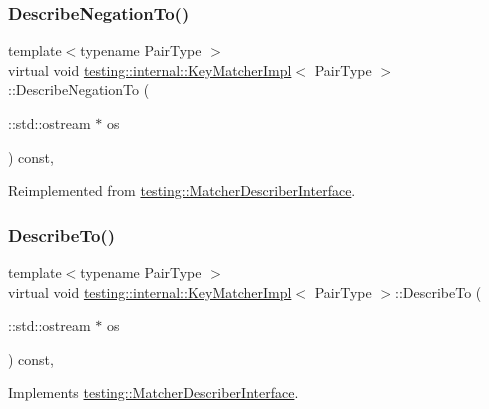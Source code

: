 \subsubsection{\texorpdfstring{Describe\+Negation\+To()}{DescribeNegationTo()}}
{\footnotesize\ttfamily template$<$typename Pair\+Type $>$ \\
virtual void \hyperlink{classtesting_1_1internal_1_1_key_matcher_impl}{testing\+::internal\+::\+Key\+Matcher\+Impl}$<$ Pair\+Type $>$\+::Describe\+Negation\+To (\begin{DoxyParamCaption}\item[{\+::std\+::ostream $\ast$}]{os }\end{DoxyParamCaption}) const\hspace{0.3cm}{\ttfamily [inline]}, {\ttfamily [virtual]}}



Reimplemented from \hyperlink{classtesting_1_1_matcher_describer_interface_a2071afbc47097c4d1c0064275af34db0}{testing\+::\+Matcher\+Describer\+Interface}.

\mbox{\label{classtesting_1_1internal_1_1_key_matcher_impl_af024a1774c1aedae7b1dc532df7e27af}} 
\subsubsection{\texorpdfstring{Describe\+To()}{DescribeTo()}}
{\footnotesize\ttfamily template$<$typename Pair\+Type $>$ \\
virtual void \hyperlink{classtesting_1_1internal_1_1_key_matcher_impl}{testing\+::internal\+::\+Key\+Matcher\+Impl}$<$ Pair\+Type $>$\+::Describe\+To (\begin{DoxyParamCaption}\item[{\+::std\+::ostream $\ast$}]{os }\end{DoxyParamCaption}) const\hspace{0.3cm}{\ttfamily [inline]}, {\ttfamily [virtual]}}



Implements \hyperlink{classtesting_1_1_matcher_describer_interface_ad9f861588bd969b6e3e717f13bb94e7b}{testing\+::\+Matcher\+Describer\+Interface}.

